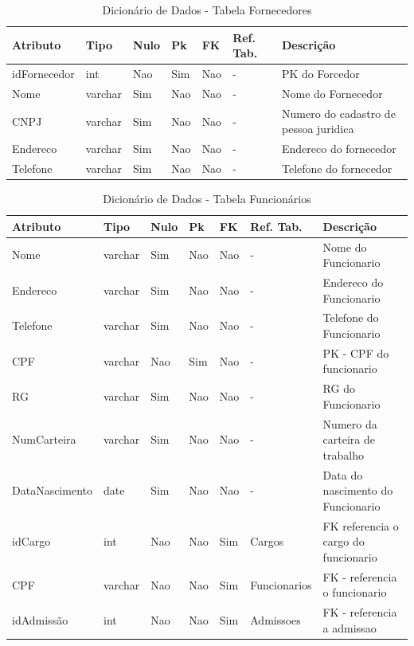\documentclass[
	12pt,				%
	openright,			%
	oneside,			%
	a4paper,			%
	chapter=TITLE,		%
	section=TITLE,		%
	english,			%
	brazil				%
	]{abntex2}
\begin{document}
    \begin{table}[htbp]
        \caption{Dicionário de Dados - Tabela Fornecedores}
        \label{tb1_dicionario_dados_fornecedores}
        \begin{tabular}{|l|l|l|l|l|l|p{3cm}|}
            \hline
            \textbf{Atributo} & 
            \textbf{Tipo} & 
            \textbf{Nulo} & 
            \textbf{Pk} & 
            \textbf{FK} & 
            \textbf{Ref. Tab.} & 
            \textbf{Descrição} \\ \hline
            idFornecedor & int & Nao & Sim & Nao & - & PK do Forcedor \\ \hline
            Nome & varchar & Sim & Nao & Nao & - & Nome do Fornecedor \\ \hline
            CNPJ & varchar & Sim & Nao & Nao & - & Numero do cadastro de pessoa juridica \\ \hline
            Endereco & varchar & Sim & Nao & Nao & - & Endereco do fornecedor \\ \hline
            Telefone & varchar & Sim & Nao & Nao & - & Telefone do fornecedor \\ \hline
        \end{tabular}
    \end{table}
    
    \begin{table}[htbp]
        \caption{Dicionário de Dados  - Tabela Funcionários}
        \label{tb1_dicionario_dados_funcionarios}
        \begin{tabular}{|l|l|l|l|l|l|p{3cm}|}
            \hline
            \textbf{Atributo} & 
            \textbf{Tipo} & 
            \textbf{Nulo} & 
            \textbf{Pk} & 
            \textbf{FK} & 
            \textbf{Ref. Tab.} & 
            \textbf{Descrição} \\ \hline
            Nome & varchar & Sim & Nao & Nao & - & Nome do Funcionario \\ \hline
            Endereco & varchar & Sim & Nao & Nao & - & Endereco do Funcionario \\ \hline
            Telefone & varchar & Sim & Nao & Nao & - & Telefone do Funcionario \\ \hline
            CPF & varchar & Nao & Sim & Nao & - & PK - CPF do funcionario \\ \hline
            RG & varchar & Sim & Nao & Nao & - & RG do Funcionario \\ \hline
            NumCarteira & varchar & Sim & Nao & Nao & - & Numero da carteira de trabalho \\ \hline
            DataNascimento & date & Sim & Nao & Nao & - & Data do nascimento do Funcionario \\ \hline
            idCargo & int & Nao & Nao & Sim & Cargos & FK referencia o cargo do funcionario \\ \hline
            CPF & varchar & Nao & Nao & Sim & Funcionarios & FK - referencia o funcionario \\ \hline
            idAdmissão & int & Nao & Nao & Sim & Admissoes & FK - referencia a admissao \\ \hline
        \end{tabular}
    \end{table}
    
\end{document}
